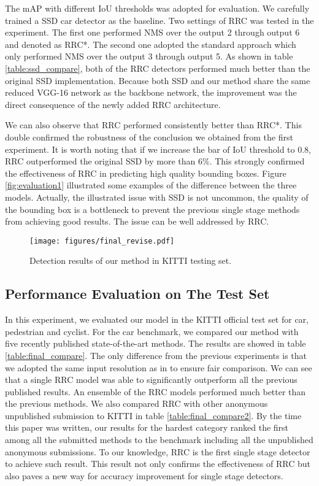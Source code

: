\documentclass[10pt,twocolumn,letterpaper]{article}
\begin{document}
The mAP with different IoU thresholds was adopted for evaluation. We carefully trained a SSD car detector as the baseline. Two settings of RRC was tested in the experiment. The first one performed NMS over the output 2 through output 6 and denoted as RRC*. The second one adopted the standard approach which only performed NMS over the output 3 through output 5. As shown in table \ref{table:ssd_compare}, both of the RRC detectors performed much better than the original SSD implementation. Because both SSD and our method share the same reduced VGG-16 network as the backbone network, the improvement was the direct consequence of the newly added RRC architecture.

We can also observe that RRC performed consistently better than RRC*. This double confirmed the robustness of the conclusion we obtained from the first experiment. It is worth noting that if we increase the bar of IoU threshold to 0.8, RRC outperformed the original SSD by more than 6\%. This strongly confirmed the effectiveness of RRC in predicting high quality bounding boxes. Figure \ref{fig:evaluation1} illustrated some examples of the difference between the three models. Actually, the illustrated issue with SSD is not uncommon, the quality of the bounding box is a bottleneck to prevent the previous single stage methods from achieving good results. The issue can be well addressed by RRC.


\begin{figure*}[thb!]
  \texttt{[image: figures/final\_revise.pdf]}
  \caption{Detection results of our method in KITTI testing set.}
  \label{fig:final}
\end{figure*}

\subsection{Performance Evaluation on The Test Set}

In this experiment, we evaluated our model in the KITTI official test set for car, pedestrian and cyclist. For the car benchmark, we compared our method with five recently published state-of-the-art methods. The results are showed in table \ref{table:final_compare}. The only difference from the previous experiments is that we adopted the same input resolution as in \cite{Cai16} to ensure fair comparison. We can see that a single RRC model was able to significantly outperform all the previous published results. An ensemble of the RRC models performed much better than the previous methods. We also compared RRC with other anonymous unpublished submission to KITTI in table \ref{table:final_compare2}. By the time this paper was written, our results for the hardest category ranked the first among all the submitted methods to the benchmark including all the unpublished anonymous submissions. To our knowledge, RRC is the first single stage detector to achieve such result. This result not only confirms the effectiveness of RRC but also paves a new way for accuracy improvement for single stage detectors.
\end{document}
